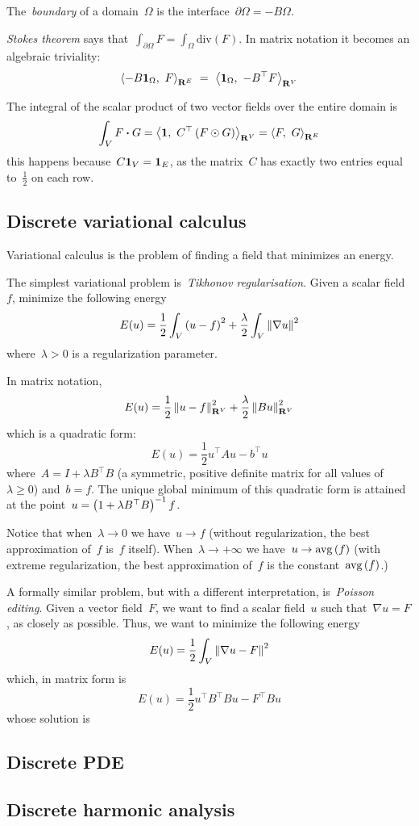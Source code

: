 The~\emph{boundary} of a domain~$\Omega$ is the
interface~$\partial\Omega=-B\Omega$.

\emph{Stokes theorem} says
that~$\int_{\partial\Omega}F=\int_\Omega\mathrm{div}\left(F\right)$.
In matrix notation it becomes an algebraic triviality:
\[
	 \left\langle-B\1_\Omega,\ F\right\rangle_{\R^E}
	 \ =\ %
	 \left\langle\1_\Omega,\ -B^\top F\right\rangle_{\R^V}
\]

The integral of the scalar product of two vector fields over the entire
domain is
\[
	\int_V F\boldsymbol{\cdot}G
	=
	\left\langle\mathbf{1},\ C^\top\left(F\odot G\right)\right\rangle_{\mathbf{R}^V}
	=
	\left\langle F,\ G\right\rangle_{\mathbf{R}^E}
\]
this happens because~$C\mathbf{1}_V=\mathbf{1}_E$, as the matrix~$C$ has exactly two entries
equal to~$\frac12$ on each row.

\clearpage
\subsection{Discrete variational calculus}

Variational calculus is the problem of finding a field that minimizes an
energy.

The simplest variational problem is~\emph{Tikhonov regularisation}.  Given a
scalar field~$f$, minimize the following energy
\[
	E(u)=\frac12\int_V \left(u-f\right)^2+\frac\lambda2\int_V \left\|\nabla u\right\|^2
\]
where~$\lambda>0$ is a regularization parameter.

In matrix notation,
\[
	E(u)=\frac12\left\|u-f\right\|^2_{\mathbf{R}^V}+\frac\lambda2\left\|Bu\right\|^2_{\mathbf{R}^V}
\]
which is a quadratic form:
\[
	E(u)=\frac12 u^\top Au-b^\top u
\]
where~$A=I+\lambda B^\top B$ (a symmetric, positive definite matrix for all
values of~$\lambda\ge0$) and~$b=f$.  The unique global minimum of this
quadratic form is attained at the point~$u=\left(1+\lambda B^\top
B\right)^{-1}f$.

Notice that when~$\lambda\to 0$ we have~$u\to f$ (without regularization, the
best approximation of~$f$ is~$f$ itself).  When~$\lambda\to+\infty$ we
have~$u\to\mathrm{avg}\left(f\right)$ (with extreme regularization, the best
approximation of~$f$ is the constant~$\mathrm{avg}\left(f\right)$.)

A formally similar problem, but with a different interpretation,
is~\emph{Poisson editing}.  Given a vector field~$F$, we want to find
a scalar field~$u$ such that~$\nabla u=F$, as closely as possible.  Thus, we
want to minimize the following energy
\[
	E(u)=\frac12\int_V\left\|\nabla u - F\right\|^2
\]
which, in matrix form is
\[
	E(u)=\frac12 u^\top B^\top B u - F^\top B u
\]
whose solution is


\clearpage
\subsection{Discrete PDE}

\clearpage
\subsection{Discrete harmonic analysis}



